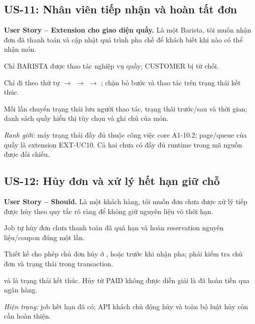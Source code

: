 \subsection{US-11: Nhân viên tiếp nhận và hoàn tất đơn}
\label{us:11}
\noindent\textbf{User Story -- Extension cho giao diện quầy.}
Là một Barista, tôi muốn nhận đơn đã thanh toán và cập nhật quá trình pha
chế để khách biết khi nào có thể nhận món.
\begin{acceptance}
    \item Chỉ BARISTA được thao tác nghiệp vụ quầy; CUSTOMER bị từ chối.
    \item Chỉ đi theo thứ tự  $\rightarrow$ 
    $\rightarrow$  $\rightarrow$ ; chặn bỏ
    bước và thao tác trên trạng thái kết thúc.
    \item Mỗi lần chuyển trạng thái lưu người thao tác, trạng thái trước/sau
    và thời gian; danh sách quầy hiển thị tùy chọn và ghi chú của món.
\end{acceptance}
\noindent\textit{Ranh giới:} máy trạng thái đầy đủ thuộc công việc core
A1-10.2; page/queue của quầy là extension EXT-UC10. Cả hai chưa có đầy đủ
runtime trong mã nguồn được đối chiếu.

\subsection{US-12: Hủy đơn và xử lý hết hạn giữ chỗ}
\label{us:12}
\noindent\textbf{User Story -- Should.}
Là một khách hàng, tôi muốn đơn chưa được xử lý tiếp được hủy theo quy
tắc rõ ràng để không giữ nguyên liệu vô thời hạn.
\begin{acceptance}
    \item Job tự hủy đơn chưa thanh toán đã quá hạn và hoàn reservation
    nguyên liệu/coupon đúng một lần.
    \item Thiết kế cho phép chủ đơn hủy ở ,
     hoặc  trước khi nhận pha; phải kiểm
    tra chủ đơn và trạng thái trong transaction.
    \item {} và  là trạng thái kết thúc.
    Hủy từ PAID không được diễn giải là đã hoàn tiền qua ngân hàng.
\end{acceptance}
\noindent\textit{Hiện trạng:} job hết hạn đã có; API khách chủ động hủy
và toàn bộ luật hủy còn cần hoàn thiện.

